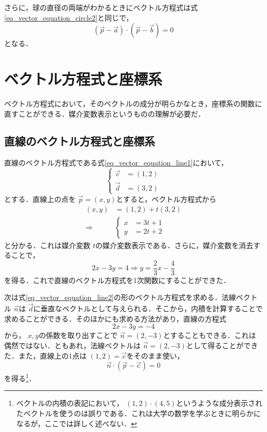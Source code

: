 \documentclass[dvipdfmx]{jsarticle}
\begin{document}
    さらに，球の直径の両端がわかるときにベクトル方程式は式\eqref{eq_vector_equation_circle2}と同じで，
    \begin{equation}
        (\vec{p}-\vec{a})\cdot(\vec{p}-\vec{b})=0
        \label{eq_vector_equation_ball2}
    \end{equation}
    となる．

    \section{ベクトル方程式と座標系}
    ベクトル方程式において，そのベクトルの成分が明らかなとき，座標系の関数に直すことができる．媒介変数表示というものの理解が必要だ．
    \subsection{直線のベクトル方程式と座標系}
    直線のベクトル方程式である式\eqref{eq_vector_equation_line1}において，
    \[
    \begin{cases}
        \vec{c}&=(1,2)\\
        \vec{d}&=(3,2)
    \end{cases}
    \]
    とする．直線上の点を \(\vec{p}=(x,y)\)とすると，ベクトル方程式から
    \begin{align*}
        (x,y)&= (1,2)+t(3,2)\\
        \Rightarrow &\begin{cases}
            x&= 3t+1\\
            y&=2t+2
        \end{cases}
    \end{align*}
    と分かる．これは媒介変数 \(t\)の媒介変数表示である．さらに，媒介変数を消去することで，
    \[
    2x-3y=4\Rightarrow y=\frac{2}{3}x- \frac{4}{3}
    \]
    を得る．これで直線のベクトル方程式を1次関数にすることができた．

    次は式\eqref{eq_vector_equation_line2}の形のベクトル方程式を求める．法線ベクトル \(\vec{n}\)は \(\vec{d}\)に垂直なベクトルとして与えられる．そこから，内積を計算することで求めることができる．そのほかにも求める方法があり，直線の方程式
    \[
    2x-3y=-4
    \]
    から， \(x,y\)の係数を取り出すことで \(\vec{n}=(2,-3)\)とすることもできる．これは偶然ではない．ともあれ，法線ベクトルは \(\vec{n}=(2,-3)\)として得ることができた．また，直線上の1点は \((1,2)=\vec{c}\)をそのまま使い，
    \[
    \vec{n}\cdot(\vec{p}-\vec{c})=0
    \]
    を得る\footnote{ベクトルの内積の表記において， \((1,2)\cdot(4,5)\)というような成分表示されたベクトルを使うのは誤りである．これは大学の数学を学ぶときに明らかになるが，ここでは詳しく述べない．}．
\end{document}
